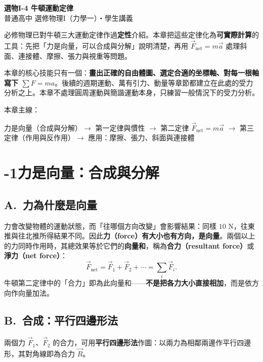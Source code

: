 \documentclass[11pt]{article}
\begin{document}
\begin{center}
{\sffamily\Huge\bfseries 選物I-4 牛頓運動定律}\\[3pt]
{\sffamily\large 普通高中 選修物理I（力學一）・學生講義}
\end{center}
\vspace{0.6em}

必修物理已對牛頓三大運動定律作過\textbf{定性}介紹。本章把這些定律化為\textbf{可實際計算}的工具：先把「力是向量，可以合成與分解」說明清楚，再用 $\vec F_{\text{net}}=m\vec a$ 處理斜面、連接體、摩擦、張力與視重等問題。

本章的核心技能只有一個：\textbf{畫出正確的自由體圖、選定合適的坐標軸、對每一根軸寫下 $\sum F=ma$}。後續的週期運動、萬有引力、動量等章節都建立在此處的受力分析之上。本章不處理圓周運動與簡諧運動本身，只練習一般情況下的受力分析。

\medskip
本章主線：

\begin{center}
力是向量（合成與分解）$\rightarrow$ 第一定律與慣性 $\rightarrow$ 第二定律 $\vec F_{\text{net}}=m\vec a$ $\rightarrow$ 第三定律（作用與反作用）$\rightarrow$ 應用：摩擦、張力、斜面與連接體
\end{center}

\section*{-1\quad 力是向量：合成與分解}

\subsection*{\sffamily A.\ 力為什麼是向量}

力會改變物體的運動狀態，而「往哪個方向改變」會影響結果：同樣 $10$ N，往東推與往北推所得結果不同。因此\textbf{力（force）有大小也有方向，是向量}。兩個以上的力同時作用時，其總效果等於它們的\textbf{向量和}，稱為\textbf{合力（resultant force）}或\textbf{淨力（net force）}：
$$\vec F_{\text{net}} = \vec F_1 + \vec F_2 + \cdots = \sum_i \vec F_i.$$
牛頓第二定律中的「合力」即為此向量和——\textbf{不是把各力大小直接相加}，而是依方向作向量加法。

\subsection*{\sffamily B.\ 合成：平行四邊形法}

兩個力 $\vec F_1$、$\vec F_2$ 的合力，可用\textbf{平行四邊形法}作圖：以兩力為相鄰兩邊作平行四邊形，其對角線即為合力 $\vec R$。
\end{document}

